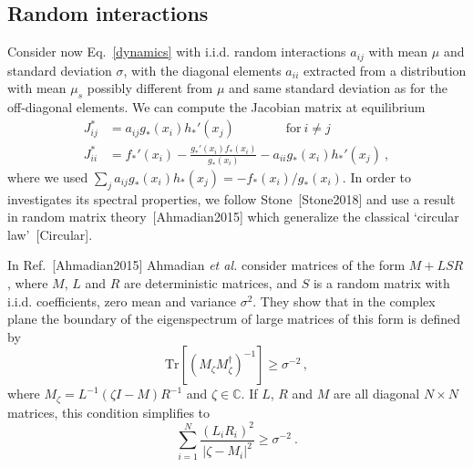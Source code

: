 \documentclass[%
 reprint,
 amsmath,amssymb,
 aps,
]{revtex4-2}
\begin{document}
\subsection{Random interactions}

Consider now Eq.~\eqref{dynamics} with i.i.d. random 
interactions $a_{ij}$ with mean $\mu$ and standard 
deviation $\sigma$, with the diagonal elements $a_{ii}$ 
extracted from a distribution with mean $\mu_s$ 
possibly different from $\mu$ and same standard deviation
as for the off-diagonal elements.  
We can compute the Jacobian matrix at equilibrium
\begin{align}
    J_{ij}^* & = a_{ij}g_*(x_i)h_*'(x_j) \qquad \qquad \textrm{for} \ i\neq j \label{eq: jac off-diag}\\
    J_{ii}^* & = f_*'(x_i) - \frac{g_*'(x_i)f_*(x_i)}{g_*(x_i)} - a_{ii}g_*(x_i)h_*'(x_j) \ , \label{eq: jac diag}
\end{align}
where we used $\sum_{j}a_{ij}g_*(x_i)h_*(x_j)=-f_*(x_i)/g_*(x_i)$.
In order to investigates its spectral properties, 
we follow Stone~[Stone2018] and use a
result in random matrix theory~[Ahmadian2015]
which generalize the classical `circular law'~[Circular].

In Ref.~[Ahmadian2015] Ahmadian \emph{et al.} 
consider matrices of the form $M + LSR$, where $M$,  
$L$ and $R$ are deterministic matrices, and $S$ 
is a random matrix with i.i.d. coefficients, 
zero mean and variance $\sigma^2$. They 
show that in the complex plane the boundary of the 
eigenspectrum of large matrices of this form is defined by
\begin{equation}
    \textrm{Tr}[(M_\zeta M_\zeta^\dagger)^{-1}]\geq \sigma^{-2} \, , 
\end{equation}
where $M_\zeta = L^{-1}(\zeta I - M)R^{-1}$ and $\zeta\in\mathbb{C}$. 
If $L$, $R$ and $M$ are all diagonal $N\times N$ matrices, 
this condition simplifies to
\begin{equation}
    \sum_{i=1}^N\frac{(L_{i}R_{i})^2}{ \vert \zeta - M_{i}\vert^2 }\geq \sigma^{-2} \ .
\label{eq: domain}
\end{equation}
\end{document}
